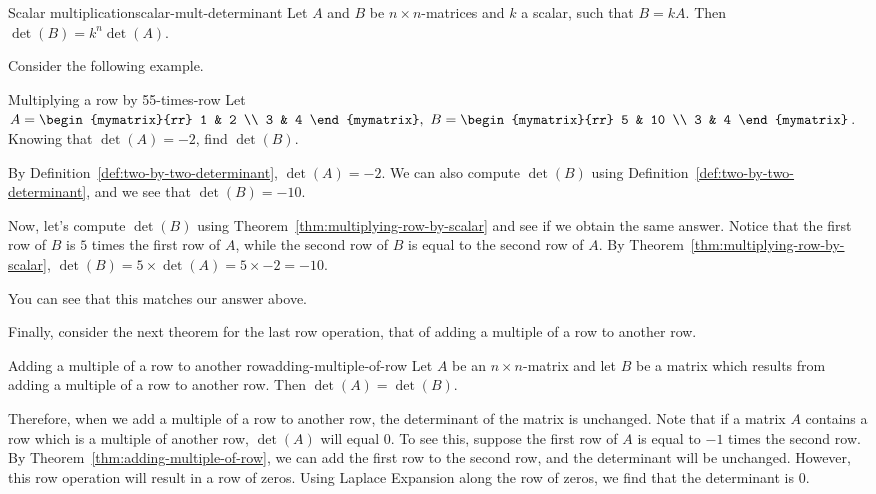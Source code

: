 \begin{theorem}{Scalar multiplication}{scalar-mult-determinant}
  Let $A$ and $B$ be $n \times n$-matrices and $k$ a scalar, such that
  $B = kA$. Then $\det(B) = k^n \det(A)$.
\end{theorem}

Consider the following example.

\begin{example}{Multiplying a row by 5}{5-times-row}
  Let $A=\begin{mymatrix}{rr}
    1 & 2 \\
    3 & 4
  \end{mymatrix} ,\ B=\begin{mymatrix}{rr}
    5 & 10 \\
    3 & 4
  \end{mymatrix}$.
  Knowing that $\det(A) =-2$, find  $\det(B)$.
\end{example}

\begin{solution}
  By Definition~\ref{def:two-by-two-determinant}, $\det(A) =-2$. We
  can also compute $\det(B)$ using
  Definition~\ref{def:two-by-two-determinant}, and we see that
  $\det(B) = -10$.

  Now, let's compute $\det(B)$ using
  Theorem~\ref{thm:multiplying-row-by-scalar} and see if we obtain the
  same answer. Notice that the first row of $B$ is $5$ times the first
  row of $A$, while the second row of $B$ is equal to the second row
  of $A$.  By Theorem~\ref{thm:multiplying-row-by-scalar},
  $\det(B) = 5 \times \det(A) = 5 \times -2 = -10$.

  You can see that this matches our answer above.
\end{solution}

Finally, consider the next theorem for the last row operation, that of
adding a multiple of a row to another row.

\begin{theorem}{Adding a multiple of a row to another row}{adding-multiple-of-row}
  Let $A$ be an $n\times n$-matrix and let $B$ be a matrix which
  results from adding a multiple of a row to another row.  Then
  $\det(A) =\det(B)$.
\end{theorem}

Therefore, when we add a multiple of a row to another row, the
determinant of the matrix is unchanged.  Note that if a matrix $A$
contains a row which is a multiple of another row, $\det(A)$ will
equal $0$. To see this, suppose the first row of $A$ is equal to $-1$
times the second row. By Theorem~\ref{thm:adding-multiple-of-row}, we
can add the first row to the second row, and the determinant will be
unchanged. However, this row operation will result in a row of zeros.
Using Laplace Expansion along the row of zeros, we find that the
determinant is $0$.

